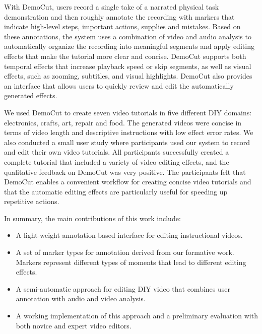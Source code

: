 With DemoCut, users record a single take of a narrated physical
task demonstration and then roughly annotate the recording with
markers that indicate high-level steps, important actions, supplies
and mistakes.
%
Based on these annotations, the system uses a combination of video and
audio analysis to automatically organize the recording into meaningful
segments and apply editing effects that make the tutorial more clear
and concise.
%
DemoCut supports both temporal effects that increase playback
speed or skip segments, as well as visual effects, such as
zooming, subtitles, and visual highlights.
%
DemoCut also provides an interface that allows users to quickly review
and edit the automatically generated effects.

We used DemoCut to create seven video tutorials in five
different DIY domains: electronics, crafts, art, repair and food.
The generated videos were concise in terms of video length and descriptive instructions with low effect error rates.
%
We also conducted a small user study where participants used
our system to record and edit their own video tutorials.
%
All participants successfully created a complete tutorial that
included a variety of video editing effects, and the qualitative
feedback on DemoCut was very positive.
%
The participants felt that DemoCut enables a convenient workflow for
creating concise video tutorials and that the automatic editing
effects are particularly useful for speeding up repetitive
actions.

In summary, the main contributions of this work include:

\begin{itemize}
\item A light-weight annotation-based interface for editing instructional videos.
\item A set of marker types for annotation derived from our formative work. Markers represent different types of moments that lead to different editing effects.
\item A semi-automatic approach for editing DIY video that
  combines user annotation with audio and video analysis.
\item A working implementation of this approach and a preliminary evaluation with both novice and expert video editors.
\end{itemize}
